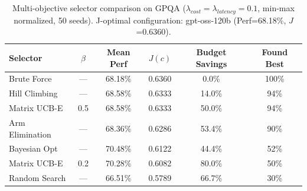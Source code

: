 \begin{table}[!htbp]
\centering
\small
\renewcommand{\arraystretch}{1.1}
\begin{tabular}{lccccc}
\toprule
\textbf{Selector} & \textbf{$\beta$} & \textbf{Mean Perf} & \textbf{$J(c)$} & \textbf{Budget Savings} & \textbf{Found Best} \\
\midrule
Brute Force & --- & 68.18\% & 0.6360 & 0.0\% & 100\% \\
\midrule
Hill Climbing & --- & 68.58\% & 0.6333 & 14.0\% & 94\% \\
Matrix UCB-E & 0.5 & 68.58\% & 0.6333 & 50.0\% & 94\% \\
Arm Elimination & --- & 68.36\% & 0.6286 & 53.4\% & 90\% \\
Bayesian Opt & --- & 70.48\% & 0.6122 & 44.4\% & 52\% \\
Matrix UCB-E & 0.2 & 70.28\% & 0.6082 & 80.0\% & 50\% \\
Random Search & --- & 66.51\% & 0.5789 & 66.7\% & 30\% \\
\bottomrule
\end{tabular}
\caption{Multi-objective selector comparison on GPQA ($\lambda_{cost}=\lambda_{latency}=0.1$, min-max normalized, 50 seeds). J-optimal configuration: gpt-oss-120b (Perf=68.18\%, $J$=0.6360).}
\label{tab:multiobjective-gpqa}
\end{table}
